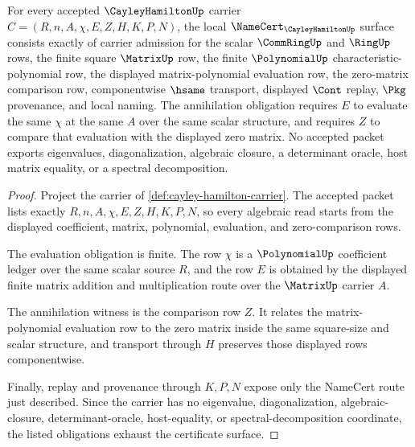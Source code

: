 \begin{theorem}
\label{thm:cayley-hamilton-namecert-obligations}
For every accepted $\CayleyHamiltonUp$ carrier $C=(R,n,A,\chi,E,Z,H,K,P,N)$, the local $\NameCert_{\CayleyHamiltonUp}$ surface consists exactly of carrier admission for the scalar $\CommRingUp$ and $\RingUp$ rows, the finite square $\MatrixUp$ row, the finite $\PolynomialUp$ characteristic-polynomial row, the displayed matrix-polynomial evaluation row, the zero-matrix comparison row, componentwise $\hsame$ transport, displayed $\Cont$ replay, $\Pkg$ provenance, and local naming. The annihilation obligation requires $E$ to evaluate the same $\chi$ at the same $A$ over the same scalar structure, and requires $Z$ to compare that evaluation with the displayed zero matrix. No accepted packet exports eigenvalues, diagonalization, algebraic closure, a determinant oracle, host matrix equality, or a spectral decomposition.
\end{theorem}
\begin{proof}
Project the carrier of \autoref{def:cayley-hamilton-carrier}. The accepted packet lists exactly $R,n,A,\chi,E,Z,H,K,P,N$, so every algebraic read starts from the displayed coefficient, matrix, polynomial, evaluation, and zero-comparison rows.

The evaluation obligation is finite. The row $\chi$ is a $\PolynomialUp$ coefficient ledger over the same scalar source $R$, and the row $E$ is obtained by the displayed finite matrix addition and multiplication route over the $\MatrixUp$ carrier $A$.

The annihilation witness is the comparison row $Z$. It relates the matrix-polynomial evaluation row to the zero matrix inside the same square-size and scalar structure, and transport through $H$ preserves those displayed rows componentwise.

Finally, replay and provenance through $K,P,N$ expose only the NameCert route just described. Since the carrier has no eigenvalue, diagonalization, algebraic-closure, determinant-oracle, host-equality, or spectral-decomposition coordinate, the listed obligations exhaust the certificate surface.
\end{proof}


